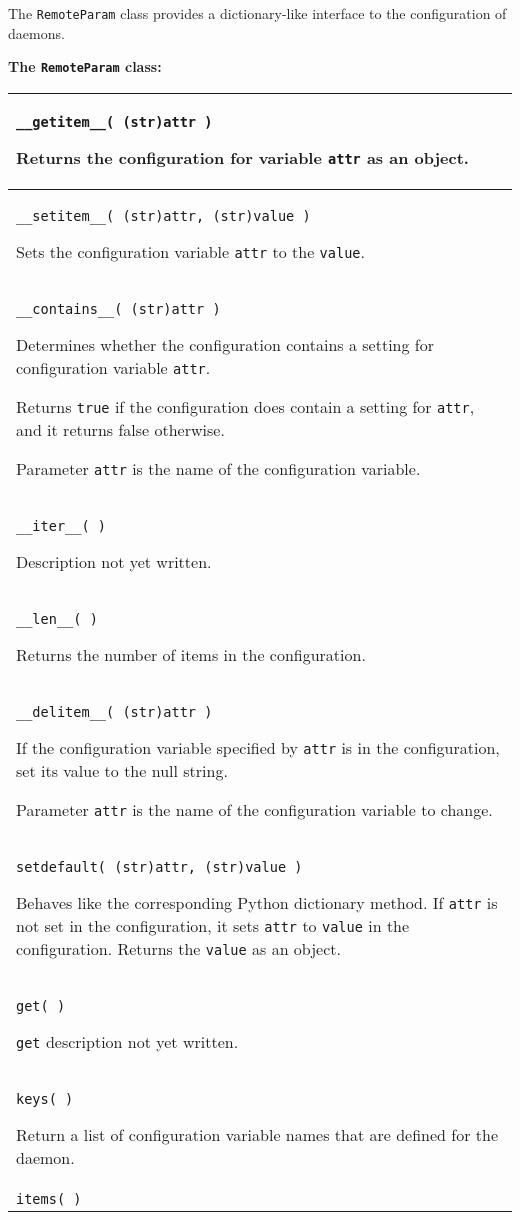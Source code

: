 The \texttt{RemoteParam} class provides a dictionary-like interface
to the configuration of daemons.

\textbf{The \texttt{RemoteParam} class:}
\begin{flushleft}
\begin{tabular}{|p{16cm}|} \hline
\texttt{\_\_getitem\_\_( (str)attr )}

Returns the configuration for variable \texttt{attr}
as an object.
\\ \hline
\texttt{\_\_setitem\_\_( (str)attr, (str)value )}

Sets the configuration variable \texttt{attr} to the \texttt{value}.
\\ \hline
\texttt{\_\_contains\_\_( (str)attr )}

Determines whether the configuration contains a setting for 
configuration variable \texttt{attr}.

Returns \texttt{true} if the configuration does contain a
setting for \texttt{attr}, and it returns false otherwise.

Parameter \texttt{attr} is the name of the configuration variable.
\\ \hline
\texttt{\_\_iter\_\_( )}

Description not yet written.
\\ \hline
\texttt{\_\_len\_\_( )}

Returns the number of items in the configuration.
\\ \hline
\texttt{\_\_delitem\_\_( (str)attr )}

If the configuration variable specified by \texttt{attr}
is in the configuration,
set its value to the null string.

Parameter \texttt{attr} is the name of the configuration variable to change.
\\ \hline
\texttt{setdefault( (str)attr, (str)value )}

Behaves like the corresponding Python dictionary method.
If \texttt{attr} is not set in the configuration,
it sets \texttt{attr} to \texttt{value} in the configuration.
Returns the \texttt{value} as an object.
\\ \hline
\texttt{get( )}

\texttt{get} description
not yet written.
\\ \hline
\texttt{keys( )}

Return a list of configuration variable names that are
defined for the daemon.
\\ \hline
\texttt{items( )}


\end{tabular}
\end{flushleft}
